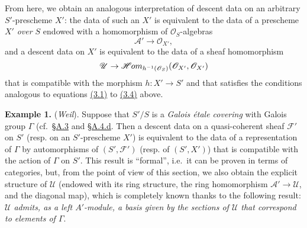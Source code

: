 \documentclass{article}
\newenvironment{rmenv}[1]
  {\phantomsection\par\smallskip\noindent\textbf{#1.}\rmfamily}
  {\par\smallskip}
\newcommand{\oldpage}[1]{\marginpar{\footnotesize$\Big\vert$ \textit{p.~#1}}}
\theoremstyle{definition}
\theoremstyle{definition}
\theoremstyle{definition}
\theoremstyle{definition}
\theoremstyle{remark}
\begin{document}
From here, we obtain an analogous interpretation of descent data on an arbitrary \(S'\)-prescheme \(X'\):
the data of such an \(X'\) is equivalent to the data of a prescheme \(X'\) \emph{over \(S\)} endowed with a homomorphism of \({\mathscr{O}}_S\)-algebras
\[
  {\mathscr{A}}'\to{\mathscr{O}}_{X'},
\]
and a descent data on \(X'\) is equivalent to the data of a sheaf homomorphism
\[
  {\mathscr{U}}
  \to \mathscr{H}\kern -.5pt om_{h^{-1}({\mathscr{O}}_S)}({\mathscr{O}}_{X'},{\mathscr{O}}_{X'})
\]
that is compatible with the morphism \(h\colon X'\to S'\) and that satisfies the conditions analogous to equations \protect\hyperlink{fga-3-i-section-B.3-equation-3.1}{(3.1)} to \protect\hyperlink{fga-3-i-section-B.3-equation-3.4}{(3.4)} above.

\leavevmode{}%
\begin{rmenv}{Example 1}
(\emph{Weil}).
Suppose that \(S'/S\) is a \emph{Galois étale covering} with Galois group \(\Gamma\) (cf.~\protect\hyperlink{fga-3-i-section-A.3}{§A.3} and \protect\hyperlink{fga-3-i-section-A.4}{§A.4.d}.
Then a descent data on a quasi-coherent sheaf \({\mathcal{F}}'\) on \(S'\) (resp. on an \(S'\)-prescheme \(X'\)) is equivalent to the data of a representation of \(\Gamma\) by automorphisms of \((S',{\mathcal{F}}')\) (resp. of \((S',X')\)) that is compatible with the action of \(\Gamma\) on \(S'\).
\oldpage{190-23}This result is ``formal'', i.e.~it can be proven in terms of categories, but, from the point of view of this section, we also obtain the explicit structure of \({\mathscr{U}}\) (endowed with its ring structure, the ring homomorphism \({\mathscr{A}}'\to{\mathscr{U}}\), and the diagonal map), which is completely known thanks to the following result:
\emph{\({\mathscr{U}}\) admits, as a left \(A'\)-module, a basis given by the sections of \({\mathscr{U}}\) that correspond to elements of \(\Gamma\)}.

\end{rmenv}
\end{document}
